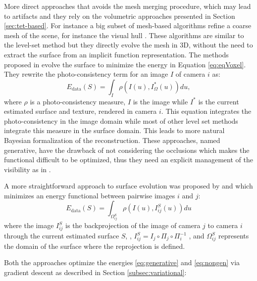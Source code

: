 More direct approaches that avoids the mesh merging procedure, which may lead to artifacts and they rely on the volumetric approaches presented in Section \ref{sec:tet-based}.
For instance a big subset of mesh-based algorithms refine a coarse mesh of the scene, for instance the visual hull \cite{hiep2009towards,zaharescu2007transformesh,delaunoy_et_al_08,gargallo2007minimizing,delaunoy2011gradient,vu2011large}. These algorithms are similar to the level-set method but they directly evolve the mesh in 3D, without the need to extract the surface from an implicit function representation.
The methods proposed in \cite{delaunoy_et_al_08,gargallo2007minimizing,delaunoy2011gradient} evolve the surface to minimize the energy in Equation \eqref{eq:eqVoxel}. They rewrite the photo-consistency term for an image $I$ of camera $i$ as:
\begin{equation}
\label{eq:generative}
  E_{\text{data}}(S) = \int_{\mathit{I}} \rho\left(I(\mathit{u}), I^*_{\Omega}(\mathit{u})\right) d\mathit{u},
\end{equation}
where $\rho$ is a photo-consistency measure, $I$ is the image while $I^*$ is the current estimated surface and texture, rendered in camera $i$.
This equation integrates the photo-consistency in the image domain while most of other level set methods integrate this measure in the surface domain. This leads to more natural Bayesian formalization of the reconstruction. 
These approaches, named generative, have the drawback of not considering the occlusions which makes the functional difficult to be optimized, thus they need an explicit management of the visibility as in \cite{delaunoy2011gradient}.

A more straightforward approach to surface evolution was proposed by \cite{hiep2009towards} and \cite{vu2011large} which minimizes an energy functional between pairwise images $i$ and $j$:
\begin{equation}
\label{eq:nongen}
  E_{\text{data}}(S) = \int_{\Omega^{\mathit{S}}_{ij}} \rho\left(I(\mathit{u}), I^{\mathit{S}}_{ij}(\mathit{u})\right) d\mathit{u}
\end{equation}
where the image $I^{\mathit{S}}_{ij}$ is the backprojection of the image of camera $j$ to camera $i$ through the current estimated surface $\mathit{S}$, \ie, $I^{\mathit{S}}_{ij} = I_j \circ \Pi_j \circ \Pi_i^{-1}$ , and $\Omega^{\mathit{S}}_{ij}$ represents the domain of the surface where the reprojection is defined.

Both the approaches optimize the energies \eqref{eq:generative} and \eqref{eq:nongen} via gradient descent as described in Section \ref{subsec:variational}:


